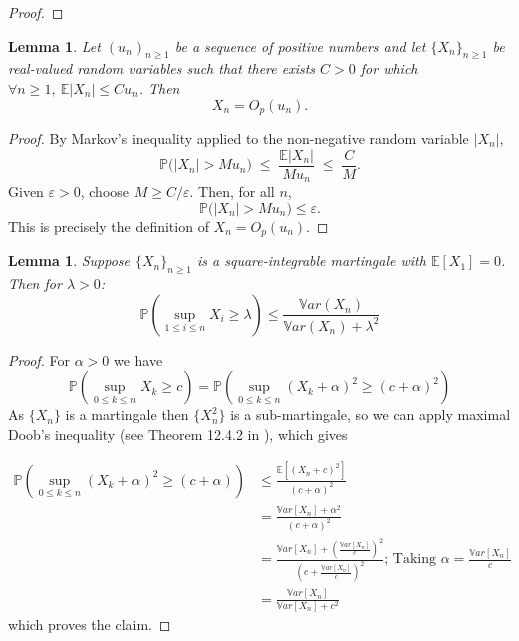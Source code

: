 \documentclass[11pt]{article}
\theoremstyle{plain}
\newtheorem{lemma}[theorem]{Lemma}
\theoremstyle{definition}
\begin{document}
\begin{appendix}
\begin{proof}
\end{proof}


\begin{lemma}\label{lem:expectation-to-O}
	Let $(u_n)_{n\ge1}$ be a sequence of positive numbers and let $\{X_n\}_{n\ge1}$ be real-valued random variables such that there exists $C>0$ for which \(\forall n \geq 1, \ \mathbb{E}|X_n|\le C u_n\). 
	Then 
	\[X_n = O_p(u_n).\]
\end{lemma}

\begin{proof}
	By Markov's inequality applied to the non-negative random variable $|X_n|$,
	\[
	\mathbb{P}\big(|X_n|> M u_n\big)
	\;\le\; \frac{\mathbb{E}|X_n|}{M u_n}
	\;\le\; \frac{C}{M}.
	\]
	Given $\varepsilon>0$, choose $M\ge C/\varepsilon$. Then, for all $n$,
	\[
	\mathbb{P}\big(|X_n|> M u_n\big)\le \varepsilon.
	\]
	This is precisely the definition of $X_n=O_p(u_n)$.
\end{proof}

\begin{lemma}\label{lem:chebychev-mart}
	Suppose  \(\{X_n\}_{n \geq 1}\) is a square-integrable martingale with \(\mathbb{E}[X_1]=0\). Then for \(\lambda > 0\):
	\[
	\mathbb{P}\left(\sup_{1\leq i \leq n} X_i \geq \lambda\right)\leq \frac{\mathbb{V}ar(X_n)}{\mathbb{V}ar(X_n)+ \lambda^2}
	\]
\end{lemma}
\begin{proof}
	For \(\alpha > 0\) we have
	\[
	\mathbb{P}\left(\sup_{0 \leq k \leq n} X_k \geq c \right) = \mathbb{P}\left(\sup_{0 \leq k \leq n} (X_k + \alpha)^2 \geq (c+\alpha)^2 \right)
	\]
	As \(\{X_n\}\) is a martingale then \(\{X_n^2\}\) is a sub-martingale, so we can apply maximal Doob's inequality (see Theorem 12.4.2 in \cite{jf-le-gall}), which gives
	
	\begin{align*}
		\mathbb{P}\left(\sup_{0 \leq k \leq n} (X_k + \alpha)^2 \geq (c + \alpha) \right) &\leq \frac{\mathbb{E}\left[(X_n + c)^2\right]}{(c + \alpha)^2}\\
		&= \frac{\mathbb{V}ar\left[X_n\right] + \alpha^2}{(c + \alpha)^2}\\
		&= \frac{\mathbb{V}ar\left[X_n\right] + \left(\frac{\mathbb{V}ar\left[X_n\right]}{c}\right)^2}{\left(c + \frac{\mathbb{V}ar\left[X_n\right]}{c}\right)^2} \text{; Taking \(\alpha = \frac{\mathbb{V}ar\left[X_n\right]}{c}\)}\\
		&= \frac{\mathbb{V}ar\left[X_n\right]}{\mathbb{V}ar\left[X_n\right] + c^2}
	\end{align*}
	which proves the claim.		
\end{proof}


\end{appendix}
\end{document}
